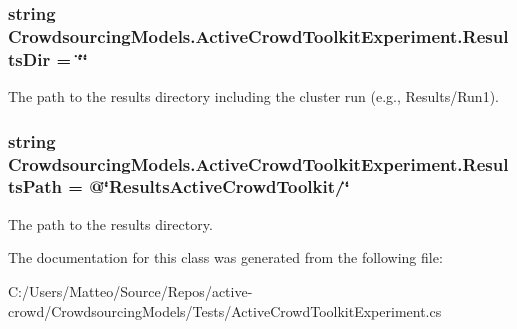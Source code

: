 \subsubsection[{Results\+Dir}]{\setlength{\rightskip}{0pt plus 5cm}string Crowdsourcing\+Models.\+Active\+Crowd\+Toolkit\+Experiment.\+Results\+Dir = \char`\"{}\char`\"{}\hspace{0.3cm}{\ttfamily [static]}}\label{class_crowdsourcing_models_1_1_active_crowd_toolkit_experiment_a244274186037359d3d71723cd7c8dd76}


The path to the results directory including the cluster run (e.\+g., Results/\+Run1). 

\hypertarget{class_crowdsourcing_models_1_1_active_crowd_toolkit_experiment_ac1654b01a9ba72b7f6b03b72467e628c}{}
\subsubsection[{Results\+Path}]{\setlength{\rightskip}{0pt plus 5cm}string Crowdsourcing\+Models.\+Active\+Crowd\+Toolkit\+Experiment.\+Results\+Path = @\char`\"{}Results\+Active\+Crowd\+Toolkit/\char`\"{}\hspace{0.3cm}{\ttfamily [static]}}\label{class_crowdsourcing_models_1_1_active_crowd_toolkit_experiment_ac1654b01a9ba72b7f6b03b72467e628c}


The path to the results directory. 



The documentation for this class was generated from the following file\+:\begin{DoxyCompactItemize}
\item 
C\+:/\+Users/\+Matteo/\+Source/\+Repos/active-\/crowd/\+Crowdsourcing\+Models/\+Tests/Active\+Crowd\+Toolkit\+Experiment.\+cs\end{DoxyCompactItemize}
